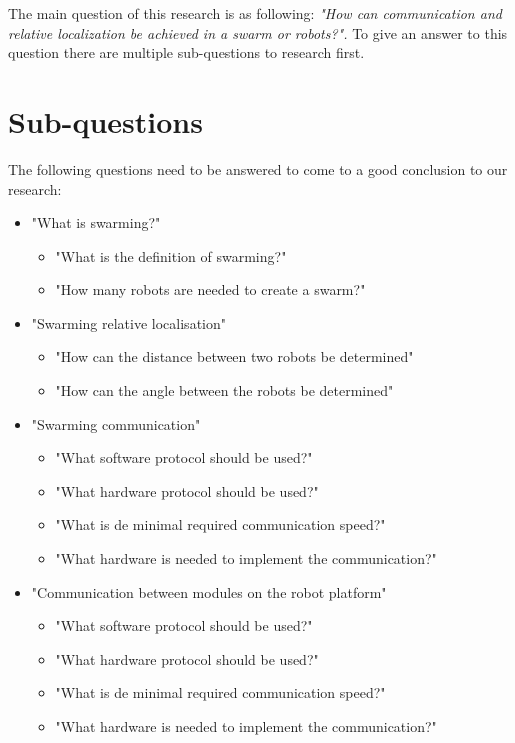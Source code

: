 \documentclass[10pt,a4paper]{article}
\begin{document}
The main question of this research is as following: \textit{"How can communication and relative localization be achieved in a swarm or robots?".} To give an answer to this question there are multiple sub-questions to research first. 
 


\section{Sub-questions} 
The following questions need to be answered to come to a good conclusion to our research:

\begin{itemize}

    \item "What is swarming?"
    \begin{itemize}
        \item "What is the definition of swarming?"
        \item "How many robots are needed to create a swarm?"
    \end{itemize}    
    \item "Swarming relative localisation"
    \begin{itemize}
        \item "How can the distance between two robots be determined"
        \item "How can the angle between the robots be determined"
    \end{itemize}
    \item "Swarming communication"
    \begin{itemize}
        \item "What software protocol should be used?"
        \item "What hardware protocol should be used?"
        \item "What is de minimal required communication speed?"
        \item "What hardware is needed to implement the communication?"
    \end{itemize}
        \item "Communication between modules on the robot platform"
    \begin{itemize}
        \item "What software protocol should be used?"
        \item "What hardware protocol should be used?"
        \item "What is de minimal required communication speed?"
        \item "What hardware is needed to implement the communication?"

\end{itemize}
\end{itemize}
\end{document}
